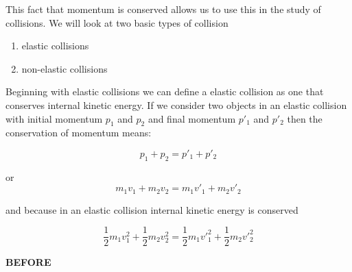 \documentclass[12pt, letterpaper, twoside]{article}
\begin{document}
This fact that momentum is conserved allows us to use this in the study of collisions.  We will look at two basic types of collision 
\begin{enumerate}
	\item elastic collisions
	\item non-elastic collisions 
\end{enumerate} 

\bigskip

Beginning with elastic collisions we can define a elastic collision as one that conserves internal kinetic energy. If we consider two objects in an elastic collision with initial momentum $p_1$ and $p_2$ and final momentum $p'_1$ and $p'_2$ then the conservation of momentum means:

\begin{equation}
p_1 + p_2 = p'_1 + p'_2 
\end{equation}

or \\
\begin{equation}
m_1 v_1 + m_2 v_2 = m_1 v'_1 + m_2 v'_2
\end{equation}
\bigskip

and because in an elastic collision internal kinetic energy is conserved

\begin{equation}
\frac{1}{2} m_1 v^2_1 + \frac{1}{2} m_2 v^2_2 = \frac{1}{2} m_1 v'^2_1 + \frac{1}{2} m_2 v'^2_2
\end{equation}

\bigskip


\textbf{BEFORE}

\begin{center}
\end{center}


\bigskip
\end{document}
